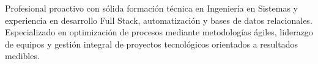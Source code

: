 
\noindent
Profesional proactivo con sólida formación técnica en Ingeniería en Sistemas y experiencia en desarrollo Full Stack, automatización y bases de datos relacionales. Especializado en optimización de procesos mediante metodologías ágiles, liderazgo de equipos y gestión integral de proyectos tecnológicos orientados a resultados medibles.
